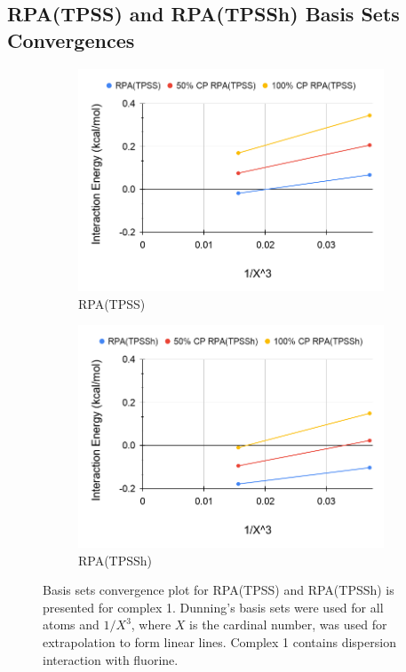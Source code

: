 \documentclass[11pt]{article}
\begin{document}
\subsection{RPA(TPSS) and RPA(TPSSh) Basis Sets Convergences}

\begin{figure}[H]
  \centering
  \begin{subfigure}{.5\textwidth}
    \centering
    \includegraphics[scale=0.3]{tpss-1.png}
    \caption{RPA(TPSS)}
    \label{fig:tpss_1}
  \end{subfigure}%
  \begin{subfigure}{.5\textwidth}
    \centering
    \includegraphics[scale=0.3]{tpssh-1.png}
    \caption{RPA(TPSSh)}
    \label{fig:tpssh_1}
  \end{subfigure}
  \caption{Basis sets convergence plot for RPA(TPSS) and RPA(TPSSh) is
    presented for complex 1. Dunning's basis sets were used for all atoms
    and $1/X^3$, where $X$ is the cardinal number, was used for
    extrapolation to form linear lines. Complex 1 contains dispersion
    interaction with fluorine.}
  \label{fig:complex_1}
\end{figure}
\end{document}
